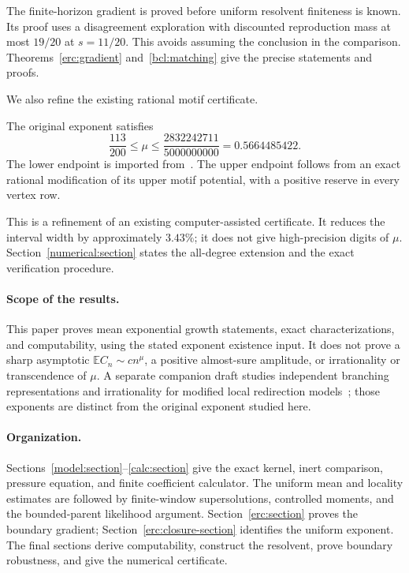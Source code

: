 The finite-horizon gradient is proved before uniform resolvent
finiteness is known. Its proof uses a disagreement exploration with
discounted reproduction mass at most $19/20$ at $s=11/20$. This avoids
assuming the conclusion in the comparison. Theorems~\ref{erc:gradient}
and~\ref{bcl:matching} give the precise statements and proofs.

We also refine the existing rational motif certificate.

\begin{theorem}
\label{main:bound}
The original exponent satisfies
\[
 \frac{113}{200}\le\mu\le
 \frac{2832242711}{5000000000}=0.5664485422.
\]
The lower endpoint is imported from~\cite{Uzay}. The upper endpoint
follows from an exact rational modification of its upper motif
potential, with a positive reserve in every vertex row.
\end{theorem}

This is a refinement of an existing computer-assisted certificate.
It reduces the interval width by approximately $3.43\%$; it does not
give high-precision digits of $\mu$. Section~\ref{numerical:section}
states the all-degree extension and the exact verification procedure.

\paragraph{Scope of the results.}
This paper proves mean exponential growth statements, exact
characterizations, and computability, using the stated exponent
existence input. It does not prove a sharp asymptotic
$\mathbb E C_n\sim c n^\mu$, a positive almost-sure amplitude, or
irrationality or transcendence of $\mu$. A separate companion draft
studies independent branching representations and irrationality for
modified local redirection models~\cite{Local}; those exponents are
distinct from the original exponent studied here.

\paragraph{Organization.}
Sections~\ref{model:section}--\ref{calc:section} give the exact kernel,
inert comparison, pressure equation, and finite coefficient calculator.
The uniform mean and locality estimates are followed by finite-window
supersolutions, controlled moments, and the bounded-parent likelihood
argument. Section~\ref{erc:section} proves the boundary gradient;
Section~\ref{erc:closure-section} identifies the uniform exponent.
The final sections derive computability, construct the resolvent,
prove boundary robustness, and give the numerical certificate.
